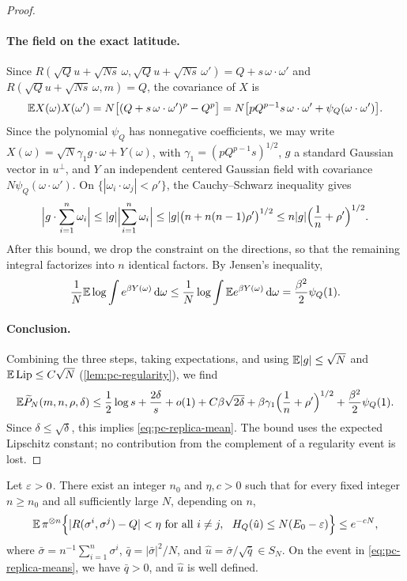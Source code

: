 \begin{proof}
\paragraph{The field on the exact latitude.}
Since $R(\sqrt Q u+\sqrt{Ns}\,\omega,\sqrt Q u+\sqrt{Ns}\,\omega')=Q+s\,\omega\cdot\omega'$ and $R(\sqrt Qu+\sqrt{Ns}\,\omega,m)=Q$, the covariance of $X$ is
\[
\mathbb E X(\omega)X(\omega')=N\bigl[(Q+s\,\omega\cdot\omega')^p-Q^p\bigr]=N\bigl[pQ^{p-1}s\,\omega\cdot\omega'+\psi_Q(\omega\cdot\omega')\bigr].
\]
Since the polynomial $\psi_Q$ has nonnegative coefficients, we may write $X(\omega)=\sqrt N\gamma_1g\cdot\omega+Y(\omega)$, with $\gamma_1=(pQ^{p-1}s)^{1/2}$, $g$ a standard Gaussian vector in $u^\perp$, and $Y$ an independent centered Gaussian field with covariance $N\psi_Q(\omega\cdot\omega')$. On $\{|\omega_i\cdot\omega_j|<\rho'\}$, the Cauchy--Schwarz inequality gives
\[
\Bigl|g\cdot\sum_{i=1}^n\omega_i\Bigr|\le|g|\Bigl|\sum_{i=1}^n\omega_i\Bigr|\le|g|\bigl(n+n(n-1)\rho'\bigr)^{1/2}\le n|g|\Bigl(\frac1n+\rho'\Bigr)^{1/2}.
\]
After this bound, we drop the constraint on the directions, so that the remaining integral factorizes into $n$ identical factors. By Jensen's inequality,
\[
\frac1N\mathbb E\log\int e^{\beta Y(\omega)}\,\mathrm d\omega\le\frac1N\log\int\mathbb E e^{\beta Y(\omega)}\,\mathrm d\omega=\frac{\beta^2}2\psi_Q(1).
\]

\paragraph{Conclusion.}
Combining the three steps, taking expectations, and using $\mathbb E|g|\le\sqrt N$ and $\mathbb E\,\mathrm{Lip}\le C\sqrt N$ (\cref{lem:pc-regularity}), we find
\[
\mathbb E\widetilde P_N(m,n,\rho,\delta)\le\frac12\log s+\frac{2\delta}s+o(1)+C\beta\sqrt{2\delta}+\beta\gamma_1\Bigl(\frac1n+\rho'\Bigr)^{1/2}+\frac{\beta^2}2\psi_Q(1).
\]
Since $\delta\le\sqrt\delta$, this implies \eqref{eq:pc-replica-mean}. The bound uses the expected Lipschitz constant; no contribution from the complement of a regularity event is lost.
\end{proof}

\begin{proposition}\label{prop:pc-replica-means}
Let $\varepsilon>0$. There exist an integer $n_0$ and $\eta,c>0$ such that for every fixed integer $n\ge n_0$ and all sufficiently large $N$, depending on $n$,
\begin{equation}\label{eq:pc-replica-means}
\mathbb E\,\pi^{\otimes n}\Bigl\{|R(\sigma^i,\sigma^j)-Q|<\eta\ \text{for all }i\ne j,\ \ H_Q(\hat u)\le N(E_0-\varepsilon)\Bigr\}\le e^{-cN},
\end{equation}
where $\bar\sigma=n^{-1}\sum_{i=1}^n\sigma^i$, $\bar q=|\bar\sigma|^2/N$, and $\hat u=\bar\sigma/\sqrt{\bar q}\in S_N$. On the event in \eqref{eq:pc-replica-means}, we have $\bar q>0$, and $\hat u$ is well defined.
\end{proposition}

